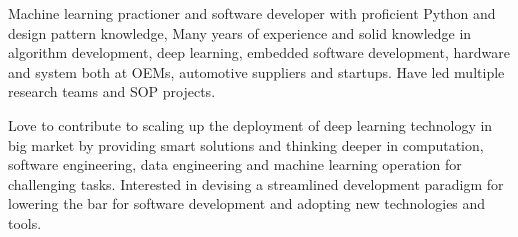 \documentclass[../resume.tex]{subfiles}
\begin{document}


\begin{cvparagraph}

Machine learning practioner and software developer with proficient Python and design pattern knowledge, Many years of experience and solid knowledge in algorithm development, deep learning, embedded software development, hardware and system both at OEMs, automotive suppliers and startups. Have led multiple research teams and SOP projects.

Love to contribute to scaling up the deployment of deep learning technology in big market by providing smart solutions and thinking deeper in computation, software engineering, data engineering and machine learning operation for challenging tasks. Interested in devising a streamlined development paradigm for lowering the bar for software development and adopting new technologies and tools.

\end{cvparagraph}
\end{document}
